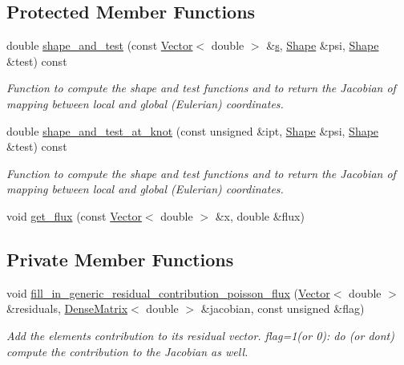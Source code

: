 \subsection*{Protected Member Functions}
\begin{DoxyCompactItemize}
\item 
double \hyperlink{classoomph_1_1PoissonFluxElement_a027e2abd393a9e53d0da0374eb556aab}{shape\+\_\+and\+\_\+test} (const \hyperlink{classoomph_1_1Vector}{Vector}$<$ double $>$ \&\hyperlink{cfortran_8h_ab7123126e4885ef647dd9c6e3807a21c}{s}, \hyperlink{classoomph_1_1Shape}{Shape} \&psi, \hyperlink{classoomph_1_1Shape}{Shape} \&test) const
\begin{DoxyCompactList}\small\item\em Function to compute the shape and test functions and to return the Jacobian of mapping between local and global (Eulerian) coordinates. \end{DoxyCompactList}\item 
double \hyperlink{classoomph_1_1PoissonFluxElement_a49ebbe60e94144a39bfa0169df410cfc}{shape\+\_\+and\+\_\+test\+\_\+at\+\_\+knot} (const unsigned \&ipt, \hyperlink{classoomph_1_1Shape}{Shape} \&psi, \hyperlink{classoomph_1_1Shape}{Shape} \&test) const
\begin{DoxyCompactList}\small\item\em Function to compute the shape and test functions and to return the Jacobian of mapping between local and global (Eulerian) coordinates. \end{DoxyCompactList}\item 
void \hyperlink{classoomph_1_1PoissonFluxElement_a51a332a35b271f1d61512ae66397aecb}{get\+\_\+flux} (const \hyperlink{classoomph_1_1Vector}{Vector}$<$ double $>$ \&x, double \&flux)
\end{DoxyCompactItemize}
\subsection*{Private Member Functions}
\begin{DoxyCompactItemize}
\item 
void \hyperlink{classoomph_1_1PoissonFluxElement_a78a7d6879d80f26ea06a905b721a3d25}{fill\+\_\+in\+\_\+generic\+\_\+residual\+\_\+contribution\+\_\+poisson\+\_\+flux} (\hyperlink{classoomph_1_1Vector}{Vector}$<$ double $>$ \&residuals, \hyperlink{classoomph_1_1DenseMatrix}{Dense\+Matrix}$<$ double $>$ \&jacobian, const unsigned \&flag)
\begin{DoxyCompactList}\small\item\em Add the element\textquotesingle{}s contribution to its residual vector. flag=1(or 0)\+: do (or don\textquotesingle{}t) compute the contribution to the Jacobian as well. \end{DoxyCompactList}\end{DoxyCompactItemize}
